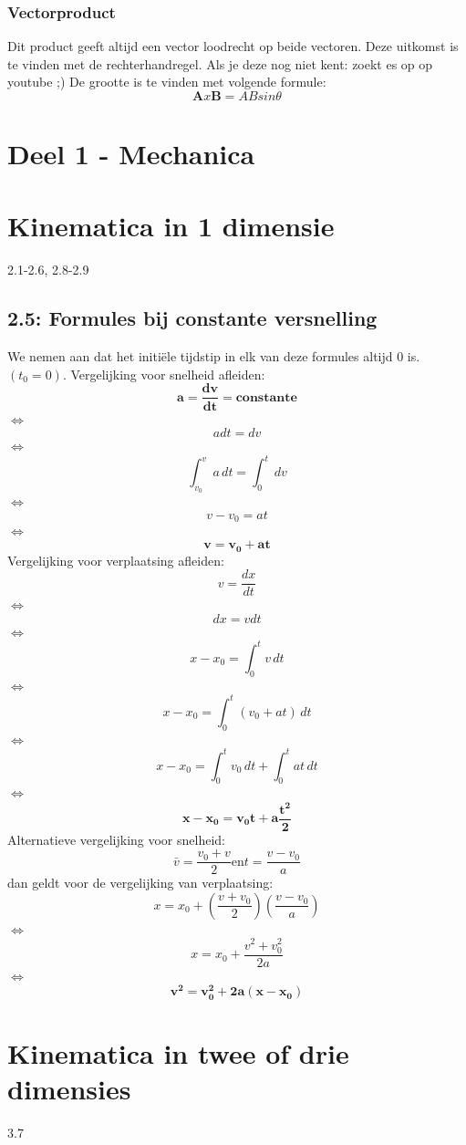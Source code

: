 \documentclass[12pt,a4paper]{article}
\begin{document}
	\subsubsection{Vectorproduct}
	Dit product geeft altijd een vector loodrecht op beide vectoren. Deze uitkomst is te vinden met de rechterhandregel. Als je deze nog niet kent: zoekt es op op youtube ;) 
	De grootte is te vinden met volgende formule: 
	\[\textbf{A} x \textbf{B} = ABsin\theta\]
	\newpage
	\section{Deel 1 - Mechanica}
	\section{Kinematica in 1 dimensie}
	2.1-2.6, 2.8-2.9
	\subsection{2.5: Formules bij constante versnelling}
	We nemen aan dat het initiële tijdstip in elk van deze formules altijd 0 is. \((t_{0} = 0)\).
	Vergelijking voor snelheid afleiden: 
	\[\mathbf{a = \frac{dv}{dt} = constante}\]
	$\iff$ \[a dt = dv\]
	$\iff$ \[\int_{v_0}^{v} a \, dt = \int_{0}^{t} \,dv\]
	$\iff$\[v - v_0 = at\]
	$\iff$\[\mathbf{v = v_0 + at}\]
	Vergelijking voor verplaatsing afleiden: 
	\[v = \frac{dx}{dt}\]
	$\iff$\[dx = v dt\]
	$\iff$\[x - x_0 = \int_{0}^{t} v \, dt\]
	$\iff$\[x - x_0 = \int_{0}^{t} (v_0 + at) \, dt\]
	$\iff$\[x - x_0 = \int_{0}^{t} v_0 \, dt + \int_{0}^{t} at \, dt\]
	$\iff$\[\mathbf{x - x_0 = v_0t + a\frac{t^2}{2}}\]
	Alternatieve vergelijking voor snelheid: 
	\[\bar{v} = \frac{v_0 + v}{2} \text{en} t = \frac{v - v_0}{a}\]
	dan geldt voor de vergelijking van verplaatsing: 
	\[x = x_0 + (\frac{v + v_0}{2})(\frac{v - v_0}{a})\]
	$\iff$\[x = x_0 + \frac{v^2 + v_0^2}{2a}\]
	$\iff$\[\mathbf{v^2 = v_0^2 + 2a(x - x_0)}\]
	\section{Kinematica in twee of drie dimensies}
	3.7
\end{document}
